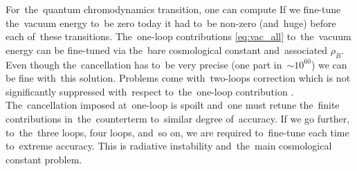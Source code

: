 For~the~quantum chromodynamics transition, one can compute
If we fine-tune the~vacuum energy to~be zero today it had to~be non-zero (and~huge) before each of~these transitions.
The~one-loop contributions \eqref{eq:vac_all} to~the~vacuum energy can be fine-tuned via the~bare cosmological constant and~associated $\rho_B$. Even though the~cancellation has to~be very precise (one part in~$\sim10^{60}$) we can be fine with~this solution. Problems come with~two-loops correction which is not significantly suppressed with~respect to~the~one-loop contribution \parencite{2012CRPhy..13..566M}. The~cancellation imposed at~one-loop is spoilt and~one must retune the~finite contributions in~the~counterterm to~similar degree of~accuracy. If we go further, to~the~three loops, four loops, and~so on, we are required to~fine-tune each time to~extreme accuracy. This is radiative instability and~the~main cosmological constant problem.

